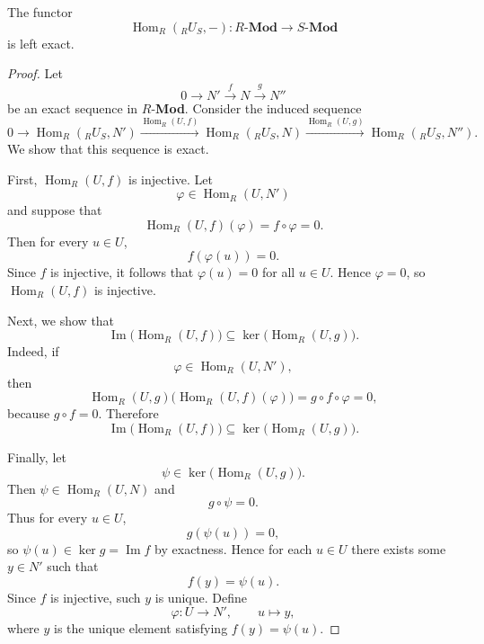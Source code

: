 \begin{theorem}
    The functor
    \[
        \operatorname{Hom}_R({}_R U_S,-): R\text{-}\mathbf{Mod}\longrightarrow S\text{-}\mathbf{Mod}
    \]
    is left exact.
\end{theorem}

\begin{proof}
    Let
    \[
        0\longrightarrow N' \xrightarrow{\,f\,} N \xrightarrow{\,g\,} N''
    \]
    be an exact sequence in $R$-\textbf{Mod}. Consider the induced sequence
    \[
        0\longrightarrow \operatorname{Hom}_R({}_R U_S,N')
        \xrightarrow{\operatorname{Hom}_R(U,f)}
        \operatorname{Hom}_R({}_R U_S,N)
        \xrightarrow{\operatorname{Hom}_R(U,g)}
        \operatorname{Hom}_R({}_R U_S,N'').
    \]
    We show that this sequence is exact.

    First, $\operatorname{Hom}_R(U,f)$ is injective. Let
    \[
        \varphi\in \operatorname{Hom}_R(U,N')
    \]
    and suppose that
    \[
        \operatorname{Hom}_R(U,f)(\varphi)=f\circ \varphi=0.
    \]
    Then for every $u\in U$,
    \[
        f(\varphi(u))=0.
    \]
    Since $f$ is injective, it follows that $\varphi(u)=0$ for all $u\in U$. Hence $\varphi=0$, so $\operatorname{Hom}_R(U,f)$ is injective.

    Next, we show that
    \[
        \operatorname{Im}\bigl(\operatorname{Hom}_R(U,f)\bigr)
        \subseteq
        \ker\bigl(\operatorname{Hom}_R(U,g)\bigr).
    \]
    Indeed, if
    \[
        \varphi\in \operatorname{Hom}_R(U,N'),
    \]
    then
    \[
        \operatorname{Hom}_R(U,g)\bigl(\operatorname{Hom}_R(U,f)(\varphi)\bigr)
        =
        g\circ f\circ \varphi
        =0,
    \]
    because $g\circ f=0$. Therefore
    \[
        \operatorname{Im}\bigl(\operatorname{Hom}_R(U,f)\bigr)
        \subseteq
        \ker\bigl(\operatorname{Hom}_R(U,g)\bigr).
    \]

    Finally, let
    \[
        \psi\in \ker\bigl(\operatorname{Hom}_R(U,g)\bigr).
    \]
    Then $\psi\in \operatorname{Hom}_R(U,N)$ and
    \[
        g\circ \psi=0.
    \]
    Thus for every $u\in U$,
    \[
        g(\psi(u))=0,
    \]
    so $\psi(u)\in \ker g=\operatorname{Im} f$ by exactness. Hence for each $u\in U$ there exists some $y\in N'$ such that
    \[
        f(y)=\psi(u).
    \]
    Since $f$ is injective, such $y$ is unique. Define
    \[
        \varphi:U\to N',\qquad u\mapsto y,
    \]
    where $y$ is the unique element satisfying $f(y)=\psi(u)$.


\end{proof}
